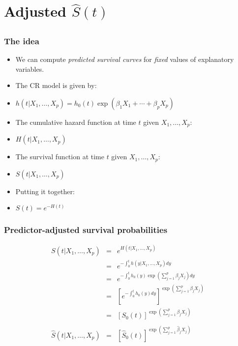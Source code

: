 \section[Adjusted $\hat{S}$(t)]{Adjusted $\hat{S}(t)$}
\subsection{}
\begin{frame}
\end{frame}

\begin{frame}
\frametitle{The idea}
\begin{itemize}
\item We can compute \emph{predicted survival curves} for \emph{fixed} values of explanatory variables.
\item The CR model is given by:
\item[] \hspace{0.3in} $h(t|X_1,\ldots,X_p)= h_0(t)\exp(\beta_1X_1+\cdots+\beta_pX_p)$
\item The cumulative hazard function at time $t$ given $X_1,\ldots,X_p$:
\item[]\hspace{0.3in}  $H(t|X_1,\ldots,X_p)$
\item The survival function at time $t$ given $X_1,\ldots,X_p$:
\item[]\hspace{0.3in}  $S(t|X_1,\ldots,X_p)$
\item Putting it together:
\item[] \hspace{0.3in}  $S(t) = e^{-H(t)}$
\end{itemize}
\end{frame}

\begin{frame}
\frametitle{Predictor-adjusted survival probabilities}
\begin{eqnarray*}
  S(t|X_1,\ldots,X_p) &=& e^{H(t|X_1,\ldots,X_p)} \\
    &=& e^{-\int_0^t h(y|X_1,\ldots,X_p)dy} \\
    &=& e^{-\int_0^t h_0(y)\exp\left(\sum\limits_{j=1}^{p}\beta_jX_j\right)dy}  \\
    &=& \left[e^{-\int_0^t h_0(y)dy}\right]^{\exp\left(\sum\limits_{j=1}^{p}\beta_jX_j\right)} \\
    &=& \left[S_0(t)\right]^{\exp\left(\sum\limits_{j=1}^{p}\beta_jX_j\right)}\\
    & & \\
  \hat{S}(t|X_1,\ldots,X_p) &=&  \left[\hat{S}_0(t)\right]^{\exp\left(\sum\limits_{j=1}^{p}\hat{\beta}_jX_j\right)}\\
\end{eqnarray*}
\end{frame}



